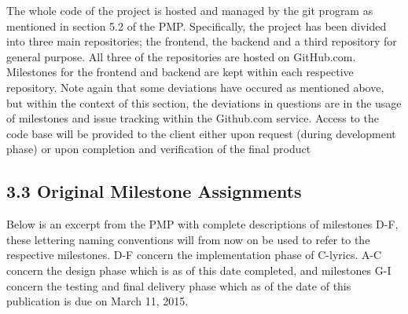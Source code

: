 \documentclass[]{article}
\begin{document}
The whole code of the project is hosted and managed by the git program
as mentioned in section 5.2 of the PMP. Specifically, the project has
been divided into three main repositories; the frontend, the backend and
a third repository for general purpose. All three of the repositories
are hosted on GitHub.com. Milestones for the frontend and backend are
kept within each respective repository. Note again that some deviations
have occured as mentioned above, but within the context of this section,
the deviations in questions are in the usage of milestones and issue
tracking within the Github.com service. Access to the code base will be
provided to the client either upon request (during development phase) or
upon completion and verification of the final product

\subsection{\textbf{3.3 Original Milestone
Assignments}}\label{original-milestone-assignments}

Below is an excerpt from the PMP with complete descriptions of
milestones D-F, these lettering naming conventions will from now on be
used to refer to the respective milestones. D-F concern the
implementation phase of C-lyrics. A-C concern the design phase which is
as of this date completed, and milestones G-I concern the testing and
final delivery phase which as of the date of this publication is due on
March 11, 2015.
\end{document}
